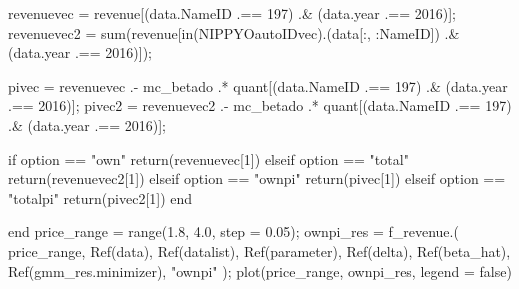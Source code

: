 \documentclass[
  letterpaper,
  DIV=11,
  numbers=noendperiod]{scrreprt}
\newenvironment{Shaded}{\begin{snugshade}}{\end{snugshade}}
\newcommand{\ConstantTok}[1]{\textcolor[rgb]{0.56,0.35,0.01}{#1}}
\newcommand{\ControlFlowTok}[1]{\textcolor[rgb]{0.00,0.23,0.31}{#1}}
\newcommand{\FloatTok}[1]{\textcolor[rgb]{0.68,0.00,0.00}{#1}}
\newcommand{\FunctionTok}[1]{\textcolor[rgb]{0.28,0.35,0.67}{#1}}
\newcommand{\KeywordTok}[1]{\textcolor[rgb]{0.00,0.23,0.31}{#1}}
\newcommand{\NormalTok}[1]{\textcolor[rgb]{0.00,0.23,0.31}{#1}}
\newcommand{\OperatorTok}[1]{\textcolor[rgb]{0.37,0.37,0.37}{#1}}
\newcommand{\StringTok}[1]{\textcolor[rgb]{0.13,0.47,0.30}{#1}}
\begin{document}
\begin{Shaded}
\begin{Highlighting}[]
\NormalTok{    revenuevec  }\OperatorTok{=}\NormalTok{ revenue[(data.NameID }\OperatorTok{.==} \FloatTok{197}\NormalTok{) }\OperatorTok{.\&}\NormalTok{ (data.year }\OperatorTok{.==} \FloatTok{2016}\NormalTok{)];}
\NormalTok{    revenuevec2 }\OperatorTok{=} \FunctionTok{sum}\NormalTok{(revenue[}\FunctionTok{in}\NormalTok{(NIPPYOautoIDvec).(data[}\OperatorTok{:}\NormalTok{, }\OperatorTok{:}\NormalTok{NameID]) }\OperatorTok{.\&}\NormalTok{ (data.year }\OperatorTok{.==} \FloatTok{2016}\NormalTok{)]);}
    
\NormalTok{    pivec  }\OperatorTok{=}\NormalTok{ revenuevec  }\OperatorTok{.{-}}\NormalTok{ mc\_betado }\OperatorTok{.*}\NormalTok{ quant[(data.NameID }\OperatorTok{.==} \FloatTok{197}\NormalTok{) }\OperatorTok{.\&}\NormalTok{ (data.year }\OperatorTok{.==} \FloatTok{2016}\NormalTok{)];}
\NormalTok{    pivec2 }\OperatorTok{=}\NormalTok{ revenuevec2 }\OperatorTok{.{-}}\NormalTok{ mc\_betado }\OperatorTok{.*}\NormalTok{ quant[(data.NameID }\OperatorTok{.==} \FloatTok{197}\NormalTok{) }\OperatorTok{.\&}\NormalTok{ (data.year }\OperatorTok{.==} \FloatTok{2016}\NormalTok{)];}

    \ControlFlowTok{if}\NormalTok{ option }\OperatorTok{==} \StringTok{"own"}
        \ControlFlowTok{return}\NormalTok{(revenuevec[}\FloatTok{1}\NormalTok{])}
    \ControlFlowTok{elseif}\NormalTok{ option }\OperatorTok{==} \StringTok{"total"}
        \ControlFlowTok{return}\NormalTok{(revenuevec2[}\FloatTok{1}\NormalTok{])}
    \ControlFlowTok{elseif}\NormalTok{ option }\OperatorTok{==} \StringTok{"ownpi"}
        \ControlFlowTok{return}\NormalTok{(pivec[}\FloatTok{1}\NormalTok{])}
    \ControlFlowTok{elseif}\NormalTok{ option }\OperatorTok{==} \StringTok{"totalpi"}
        \ControlFlowTok{return}\NormalTok{(pivec2[}\FloatTok{1}\NormalTok{])}
    \ControlFlowTok{end}
    
\KeywordTok{end}
\NormalTok{price\_range }\OperatorTok{=} \FunctionTok{range}\NormalTok{(}\FloatTok{1.8}\NormalTok{, }\FloatTok{4.0}\NormalTok{, step }\OperatorTok{=} \FloatTok{0.05}\NormalTok{);}
\NormalTok{ownpi\_res }\OperatorTok{=} \FunctionTok{f\_revenue}\NormalTok{.(}
\NormalTok{    price\_range, }
    \FunctionTok{Ref}\NormalTok{(data), }\FunctionTok{Ref}\NormalTok{(datalist), }\FunctionTok{Ref}\NormalTok{(parameter), }\FunctionTok{Ref}\NormalTok{(delta), }\FunctionTok{Ref}\NormalTok{(beta\_hat), }\FunctionTok{Ref}\NormalTok{(gmm\_res.minimizer),}
    \StringTok{"ownpi"}
\NormalTok{);}
\FunctionTok{plot}\NormalTok{(price\_range, ownpi\_res, legend }\OperatorTok{=} \ConstantTok{false}\NormalTok{)}
\end{Highlighting}
\end{Shaded}
\end{document}
